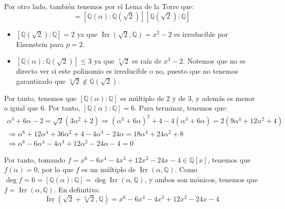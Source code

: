 \documentclass[12pt]{article}
\DeclareMathOperator{\Irr}{Irr}
\begin{document}
\begin{ejercicio}
\begin{enumerate}[label=\alph*)]
            Por otro lado, también tenemos por el Lema de la Torre que:
            \begin{equation*}
                [\mathbb{Q}(\alpha):\mathbb{Q}] = [\mathbb{Q}(\alpha):\mathbb{Q}(\sqrt{2})][\mathbb{Q}(\sqrt{2}):\mathbb{Q}]
            \end{equation*}
            \begin{itemize}
                \item $[\mathbb{Q}(\sqrt{2}):\mathbb{Q}] = 2$ ya que $\Irr(\sqrt{2},\mathbb{Q}) = x^2-2$ es irreducible por Eisenstein para $p=2$.
                \item $[\mathbb{Q}(\alpha):\mathbb{Q}(\sqrt{2})] \leq 3$ ya que $\sqrt[3]{2}$ es raíz de $x^3-2$. Notemos que no es directo ver si este polinomio es irreducible o no, puesto que no tenemos garantizado que $\sqrt[3]{2}\notin \mathbb{Q}(\sqrt{2})$.
            \end{itemize}

            Por tanto, tenemos que $[\mathbb{Q}(\alpha):\mathbb{Q}]$ es múltiplo de 2 y de 3, y además es menor o igual que 6. Por tanto, $[\mathbb{Q}(\alpha):\mathbb{Q}] = 6$. Para terminar, tenemos que:
            \begin{multline*}
                \alpha^3+6\alpha-2 = \sqrt{2}(3\alpha^2+2) \Longrightarrow (\alpha^3+6\alpha)^2 +4 -4(\alpha^3+6\alpha) = 2(9\alpha^4 + 12\alpha^2 + 4)\\
                \Longrightarrow \alpha^6 + 12\alpha^4 + 36\alpha^2 + 4 - 4\alpha^3 - 24\alpha = 18\alpha^4 + 24\alpha^2 + 8 \\\Longrightarrow \alpha^6 - 6\alpha^4 -4\alpha^3 + 12\alpha^2 - 24\alpha - 4 = 0
            \end{multline*}

            Por tanto, tomando $f = x^6 - 6x^4 -4x^3 + 12x^2 - 24x - 4\in \mathbb{Q}[x]$, tenemos que $f(\alpha)=0$, por lo que $f$ es un múltiplo de $\Irr(\alpha,\mathbb{Q})$. Como $\deg f = 6 = [\mathbb{Q}(\alpha):\mathbb{Q}] = \deg \Irr(\alpha,\mathbb{Q})$, y ambos son mónicos, tenemos que $f = \Irr(\alpha,\mathbb{Q})$. En definitiva:
            \begin{equation*}
                \Irr(\sqrt{2}+\sqrt[3]{2},\mathbb{Q}) = x^6 - 6x^4 -4x^3 + 12x^2 - 24x - 4
            \end{equation*}
    \end{enumerate}
\end{ejercicio}
    
\end{document}
